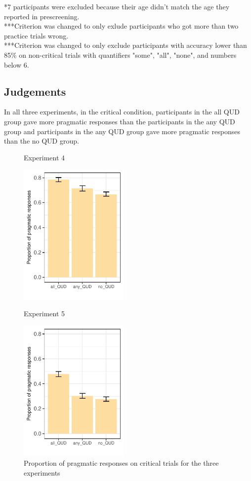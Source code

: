 \documentclass[12pt]{article}
\begin{document}
    *7 participants were excluded because their age didn't match the age they reported in prescreening. \\ 
    ***Criterion was changed to only exlude participants who got more than two practice trials wrong. \\
    ***Criterion was changed to only exclude participants with accuracy lower than 85\% on non-critical trials with quantifiers "some", "all", "none", and numbers below 6.

\subsection*{Judgements}

In all three experiments, in the critical condition, participants in the all QUD group gave more pragmatic responses than the participants in the any QUD group and participants in the any QUD group gave more pragmatic responses than the no QUD group.  
\\
\begin{figure}[!ht]  
\begin{minipage}{.5\textwidth}
    \caption*{Experiment 4}
    \includegraphics[height=7cm]{img/exp4_proportion_pragmatic.pdf}    
    \end{minipage}%
\begin{minipage}{.5\textwidth}
    \caption*{Experiment 5}
    \includegraphics[height=7cm]{img/exp5_proportion_pragmatic.pdf}
    \end{minipage}%
    \caption{Proportion of pragmatic responses on critical trials for the three experiments}
\end{figure}
\end{document}
